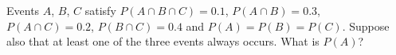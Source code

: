 Events $A$, $B$, $C$ satisfy $P(A\cap B\cap C)=0.1$, $P(A\cap B)=0.3$, $P(A\cap C)=0.2$, $P(B\cap C)=0.4$ and $P(A)=P(B)=P(C)$. Suppose also that at least one of the three events always occurs. What is $P(A)$?
